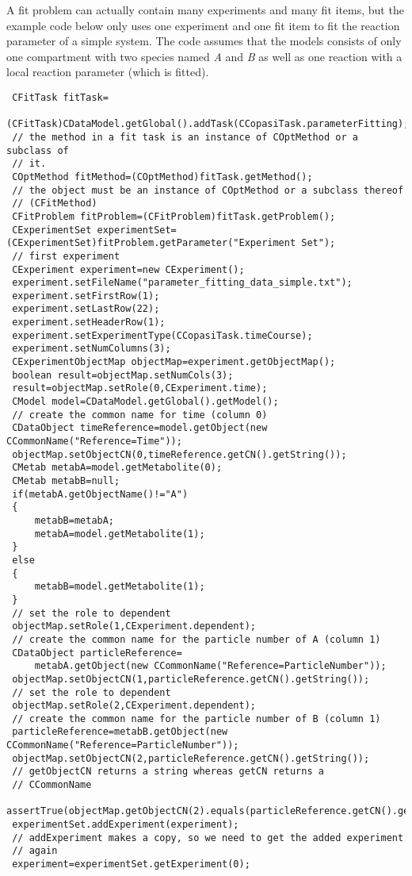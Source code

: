 \documentclass[a4,10pt]{article}
\begin{document}
A fit problem can actually contain many experiments and many fit items, but the example code below only uses one experiment and one fit item to fit the reaction parameter of a simple system. The code assumes that the models consists of only one compartment with two species named \textit{A} and \textit{B} as well as one reaction with a local reaction parameter (which is fitted).

\begin{lstlisting}
 CFitTask fitTask=
   (CFitTask)CDataModel.getGlobal().addTask(CCopasiTask.parameterFitting);
 // the method in a fit task is an instance of COptMethod or a subclass of
 // it.
 COptMethod fitMethod=(COptMethod)fitTask.getMethod();
 // the object must be an instance of COptMethod or a subclass thereof
 // (CFitMethod)
 CFitProblem fitProblem=(CFitProblem)fitTask.getProblem();
 CExperimentSet experimentSet=(CExperimentSet)fitProblem.getParameter("Experiment Set");
 // first experiment
 CExperiment experiment=new CExperiment();
 experiment.setFileName("parameter_fitting_data_simple.txt");
 experiment.setFirstRow(1);
 experiment.setLastRow(22);
 experiment.setHeaderRow(1);
 experiment.setExperimentType(CCopasiTask.timeCourse);
 experiment.setNumColumns(3);
 CExperimentObjectMap objectMap=experiment.getObjectMap();
 boolean result=objectMap.setNumCols(3);
 result=objectMap.setRole(0,CExperiment.time);
 CModel model=CDataModel.getGlobal().getModel();
 // create the common name for time (column 0)
 CDataObject timeReference=model.getObject(new CCommonName("Reference=Time"));
 objectMap.setObjectCN(0,timeReference.getCN().getString());
 CMetab metabA=model.getMetabolite(0);
 CMetab metabB=null;
 if(metabA.getObjectName()!="A")
 {
     metabB=metabA;
     metabA=model.getMetabolite(1);
 }
 else
 {
     metabB=model.getMetabolite(1);
 }
 // set the role to dependent
 objectMap.setRole(1,CExperiment.dependent);
 // create the common name for the particle number of A (column 1)
 CDataObject particleReference=
     metabA.getObject(new CCommonName("Reference=ParticleNumber"));
 objectMap.setObjectCN(1,particleReference.getCN().getString());
 // set the role to dependent
 objectMap.setRole(2,CExperiment.dependent);
 // create the common name for the particle number of B (column 1)
 particleReference=metabB.getObject(new CCommonName("Reference=ParticleNumber"));
 objectMap.setObjectCN(2,particleReference.getCN().getString());
 // getObjectCN returns a string whereas getCN returns a
 // CCommonName
 assertTrue(objectMap.getObjectCN(2).equals(particleReference.getCN().getString()));
 experimentSet.addExperiment(experiment);
 // addExperiment makes a copy, so we need to get the added experiment
 // again
 experiment=experimentSet.getExperiment(0);


\end{lstlisting}
\end{document}
